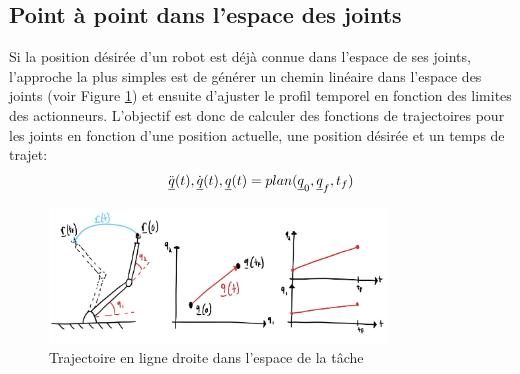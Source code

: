 \subsection{Point à point dans l'espace des joints}

Si la position désirée d'un robot est déjà connue dans l'espace de ses joints, l'approche la plus simples est de générer un chemin linéaire dans l'espace des joints (voir Figure \ref{fig:traj_joint_line}) et ensuite d'ajuster le profil temporel en fonction des limites des actionneurs. L'objectif est donc de calculer des fonctions de trajectoires pour les joints en fonction d'une position actuelle, une position désirée et un temps de trajet:
\begin{align}
  \ddot{\underline{q}}(t),\dot{\underline{q}}(t),\underline{q}(t) = plan(\underline{q}_{0}, \underline{q}_f, t_f)
	\label{eq:trajgen}
\end{align}
\begin{figure}[ht]
	\centering
		\includegraphics[width=0.80\textwidth]{fig/traj_joint_line.jpeg}
	\caption{Trajectoire en ligne droite dans l'espace de la tâche}
	\label{fig:traj_joint_line}
\end{figure}

